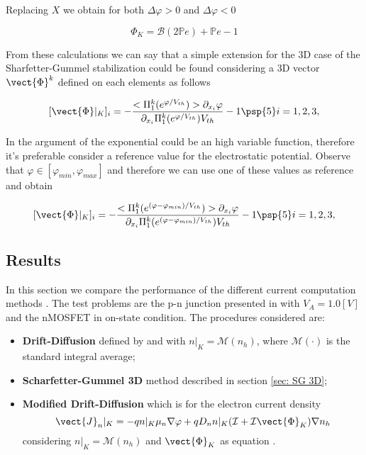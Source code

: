 Replacing $X$ we obtain for both $\Delta \varphi > 0$ and $\Delta \varphi < 0$

\begin{equation}
\Phi_K = \mathcal{B}(2\mathbb{P}e) + \mathbb{P}e -1
\end{equation}


From these calculations we can say that a simple extension for the 3D case of the Sharfetter-Gummel stabilization could be found considering a 3D vector  $\vect{\Phi}^k$  defined on each elements as follows

\begin{equation}
\label{eq: SG stabilized}
[\vect{\Phi}|_K]_i = -\dfrac{<\Pi_1^k(e^{\varphi/V_{th}})> \partial_{x_i}\varphi}{\partial_{x_i}\Pi_1^k(e^{\varphi/V_{th}})V_{th}} -1 \psp{5} i = 1,2,3,
\end{equation}

In  the argument of the exponential could be an high variable function, therefore it's preferable consider a reference value for the electrostatic potential.
 Observe that $\varphi \in [\varphi_{min},\varphi_{max}]$ and therefore we can use one of these values as reference and obtain
 
 \begin{equation}
\label{eq: SG stabilized}
[\vect{\Phi}|_K]_i = -\dfrac{<\Pi_1^k(e^{(\varphi-\varphi_{min})/V_{th}})> \partial_{x_i}\varphi}{\partial_{x_i}\Pi_1^k(e^{(\varphi-\varphi_{min})/V_{th}})V_{th}} -1 \psp{5} i = 1,2,3,
\end{equation}

\subsection{Results}

In this section we compare the performance of the different current computation methods . The test problems are the p-n junction presented in  with $V_A=1.0[V]$ and the nMOSFET  in on-state condition.
The procedures considered are:
\begin{itemize}
\item {\bf Drift-Diffusion} defined by  and  with $n|_K=\mathcal{M}(n_h)$, where $\mathcal{M}(\cdot)$ is the standard integral average;
\item {\bf Scharfetter-Gummel 3D} method described in section \ref{sec: SG 3D};
\item {\bf Modified Drift-Diffusion} which is for the electron current density 
\begin{equation}
\vect{J}_n|_K = -qn|_K\mu_n\nabla \varphi + qD_nn|_K(\mathcal{I}+\mathcal{I}\vect{\Phi}_K) \nabla n_h 
\end{equation}
considering $n|_K=\mathcal{M}(n_h)$ and $\vect{\Phi}_K$ as equation .
\end{itemize}


